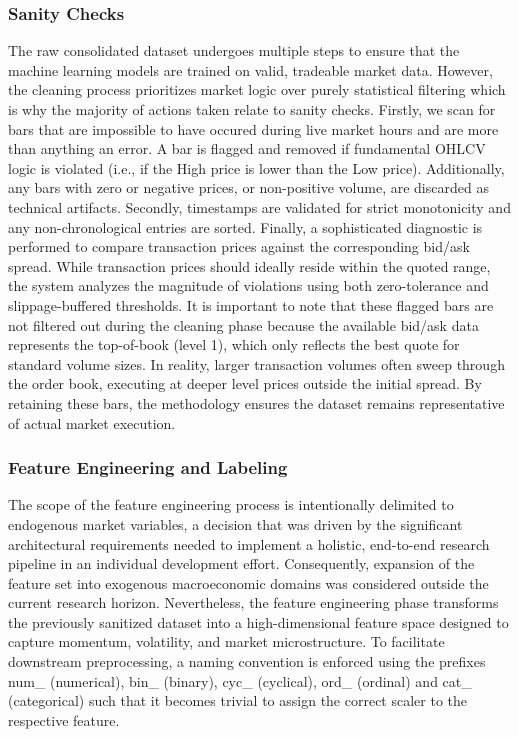 \documentclass[12pt, a4paper]{article}
\begin{document}
\subsubsection{Sanity Checks}\label{sec:sanity_checks}

The raw consolidated dataset undergoes multiple steps to ensure that the machine learning models are trained on valid, tradeable market data. However, the cleaning
process prioritizes market logic over purely statistical filtering which is why the majority of actions taken relate to sanity checks.
Firstly, we scan for bars that are impossible to have occured during live market hours and are more than anything an error. 
A bar is flagged and removed if fundamental OHLCV logic is violated (i.e., if the High price is lower than the Low price). 
Additionally, any bars with zero or negative prices, or non-positive volume, are discarded as technical artifacts.
Secondly, timestamps are validated for strict monotonicity and any non-chronological entries are sorted.
Finally, a sophisticated diagnostic is performed to compare transaction prices against the corresponding bid/ask spread. 
While transaction prices should ideally reside within the quoted range, the system analyzes the magnitude of violations using both zero-tolerance and slippage-buffered thresholds. 
It is important to note that these flagged bars are not filtered out during the cleaning phase because the available bid/ask data represents 
the top-of-book (level 1), which only reflects the best quote for standard volume sizes. 
In reality, larger transaction volumes often sweep through the order book, executing at deeper level prices outside the initial spread. 
By retaining these bars, the methodology ensures the dataset remains representative of actual market execution.


\subsubsection{Feature Engineering and Labeling}\label{sec:features_labels}

The scope of the feature engineering process is intentionally delimited to endogenous market variables, a decision that was driven by the significant 
architectural requirements needed to implement a holistic, end-to-end research pipeline in an individual development effort. 
Consequently, expansion of the feature set into exogenous macroeconomic domains was considered outside the current research horizon.
Nevertheless, the feature engineering phase transforms the previously sanitized dataset into a high-dimensional feature space designed to capture momentum, volatility, and market microstructure. 
To facilitate downstream preprocessing, a naming convention is enforced using the prefixes num\_ (numerical), bin\_ (binary), cyc\_ (cyclical), ord\_ (ordinal) and cat\_ (categorical) such that it becomes 
trivial to assign the correct scaler to the respective feature.
\end{document}
